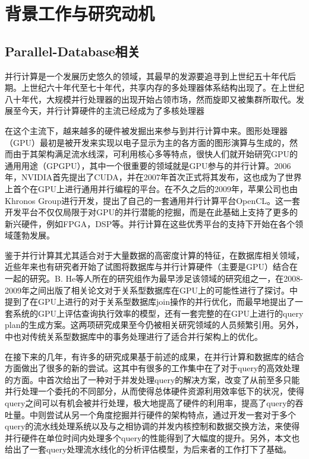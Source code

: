 \chapter{背景工作与研究动机}
\section{Parallel-Database相关}

并行计算是一个发展历史悠久的领域，其最早的发源要追寻到上世纪五十年代后期。上世纪六十年代至七十年代，共享内存的多处理器体系结构出现了。在上世纪八十年代，大规模并行处理器的出现开始占领市场，然而旋即又被集群所取代。发展至今天，并行计算硬件的主流已经成为了多核处理器\cite{ManycoreShift}

在这个主流下，越来越多的硬件被发掘出来参与到并行计算中来。图形处理器（GPU）最初是被开发来实现以电子显示为主的各方面的图形演算与生成的，然而由于其架构满足流水线深，可利用核心多等特点，很快人们就开始研究GPU的通用用途（GPGPU），其中一个很重要的领域就是GPU参与的并行计算。2006年，NVIDIA首先提出了CUDA，并在2007年首次正式将其发布，这也成为了世界上首个在GPU上进行通用并行编程的平台\cite{cudaofficial}\cite{CUDA}。在不久之后的2009年，苹果公司也由Khronos Group进行开发，提出了自己的一套通用并行计算平台OpenCL\cite{OpenCL}。这一套开发平台不仅仅局限于对GPU的并行潜能的挖掘，而是在此基础上支持了更多的新兴硬件，例如FPGA，DSP等。并行计算在这些优秀平台的支持下开始在各个领域蓬勃发展。

鉴于并行计算其尤其适合对于大量数据的高密度计算的特征，在数据库相关领域，近些年来也有研究者开始了试图将数据库与并行计算硬件（主要是GPU）结合在一起的研究。B. He等人所在的研究组作为最早涉足该领域的研究组之一，在2008-2009年之间出版了相关论文对于关系型数据库在GPU上的可能性进行了探讨。\cite{heSIGMOD2008}中提到了在GPU上进行的对于关系型数据库join操作的并行优化，而\cite{heACMTDS2009}最早地提出了一套系统的GPU上评估查询执行效率的模型，还有一套完整的在GPU上进行的query plan的生成方案。这两项研究成果至今仍被相关研究领域的人员频繁引用。另外，\cite{heVLDB2011}中也对传统关系型数据库中的事务处理进行了适合并行架构上的优化。

在接下来的几年，有许多的研究成果基于前述的成果，在并行计算和数据库的结合方面做出了很多的新的尝试。这其中有很多的工作集中在了对于query的高效处理的方面。\cite{wangVLDB2014}中首次给出了一种对于并发处理query的解决方案，改变了从前至多只能并行处理一个委托的不同部分，从而使得总体硬件资源利用效率低下的状况，使得query之间可以有机会被并行处理，极大地提高了硬件的利用率，提高了query的吞吐量。\cite{johnsSIGMOD2016}中则尝试从另一个角度挖掘并行硬件的架构特点，通过开发一套对于多个query的流水线处理系统以及与之相协调的并发内核控制和数据交换方法，来使得并行硬件在单位时间内处理多个query的性能得到了大幅度的提升。另外，本文也给出了一套query处理流水线化的分析评估模型，为后来者的工作打下了基础。

